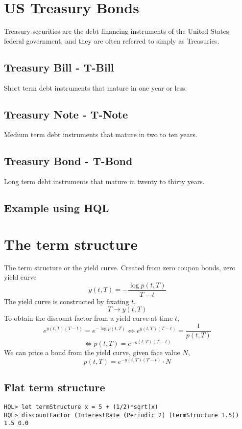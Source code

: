 \documentclass[11pt,a4paper]{article}
\numberwithin{equation}{section}
\begin{document}

\section{US Treasury Bonds}
Treasury securities are the debt financing instruments of the United States federal government, and they are often referred to simply as Treasuries.
\subsection{Treasury Bill - T-Bill}
Short term debt instruments that mature in one year or less.
\subsection{Treasury Note - T-Note}
Medium term debt instruments that mature in two to ten years.
\subsection{Treasury Bond - T-Bond}
Long term debt instruments that mature in twenty to thirty years.

\subsection{Example using HQL}

\section{The term structure}
The term structure or the yield curve.
Created from zero coupon bonds, zero yield curve
\[
y(t,T)=-\frac{\log{p(t,T)}}{T-t}
\]
The yield curve is constructed by fixating $t$,
\[
T\to y(t,T)
\]
To obtain the discount factor from a yield curve at time $t$,
\[
e^{y(t,T)(T-t)}=e^{-\log{p(t,T)}}\iff e^{y(t,T)(T-t)}=\frac{1}{p(t,T)}
\]
\[
\iff p(t,T)=e^{-y(t,T)(T-t)}
\]
We can price a bond from the yield curve, given face value $N$,
\[
p(t,T)=e^{-y(t,T)(T-t)}\cdot N
\]

\subsection{Flat term structure}
\begin{lstlisting}
HQL> let termStructure x = 5 + (1/2)*sqrt(x)
HQL> discountFactor (InterestRate (Periodic 2) (termStructure 1.5)) 1.5 0.0
\end{lstlisting}
\end{document}
